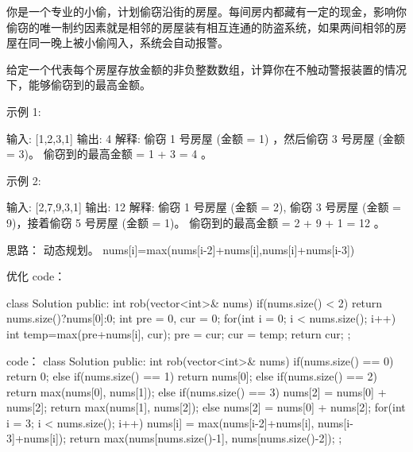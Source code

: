 你是一个专业的小偷，计划偷窃沿街的房屋。每间房内都藏有一定的现金，影响你偷窃的唯一制约因素就是相邻的房屋装有相互连通的防盗系统，如果两间相邻的房屋在同一晚上被小偷闯入，系统会自动报警。

给定一个代表每个房屋存放金额的非负整数数组，计算你在不触动警报装置的情况下，能够偷窃到的最高金额。

示例 1:

输入: [1,2,3,1]
输出: 4
解释: 偷窃 1 号房屋 (金额 = 1) ，然后偷窃 3 号房屋 (金额 = 3)。
     偷窃到的最高金额 = 1 + 3 = 4 。

示例 2:

输入: [2,7,9,3,1]
输出: 12
解释: 偷窃 1 号房屋 (金额 = 2), 偷窃 3 号房屋 (金额 = 9)，接着偷窃 5 号房屋 (金额 = 1)。
     偷窃到的最高金额 = 2 + 9 + 1 = 12 。































思路：
动态规划。
nums[i]=max(nums[i-2]+nums[i],nums[i]+nums[i-3])




优化 code：

class Solution {
public:
    int rob(vector<int>& nums) {
        if(nums.size() < 2) return nums.size()?nums[0]:0;
        int pre = 0, cur = 0;
        for(int i = 0; i < nums.size(); i++)
        {
            int temp=max(pre+nums[i], cur);
            pre = cur;
            cur = temp;
        }
        return cur;
    }
};























code：
class Solution {
public:
    int rob(vector<int>& nums) {
        if(nums.size() == 0) return 0;
        else if(nums.size() == 1) return nums[0];
        else if(nums.size() == 2) return max(nums[0], nums[1]);
        else if(nums.size() == 3)
        {
            nums[2] = nums[0] + nums[2];
            return max(nums[1], nums[2]);
        }
        else
        {
            nums[2] = nums[0] + nums[2];
            for(int i = 3; i < nums.size(); i++)
            {
                nums[i] = max(nums[i-2]+nums[i], nums[i-3]+nums[i]);
            }
        }
        return max(nums[nums.size()-1], nums[nums.size()-2]);
    }
};
